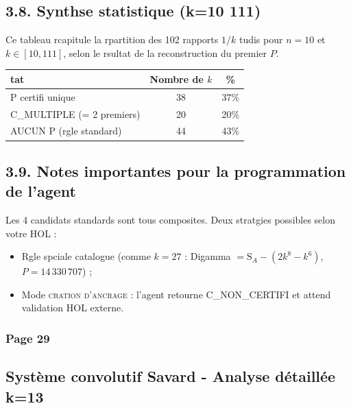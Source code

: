 \documentclass[11pt,a4paper]{article}
\newcommand{\SA}{\mathrm{S}_A}
\begin{document}
\subsection*{3.8. Synthse statistique (k=10  111)}

\vspace{0.3cm}

Ce tableau rcapitule la rpartition des 102 rapports $1/k$ tudis pour $n=10$ et $k \in [10,111]$, selon le rsultat de la reconstruction du premier $P$.

\begin{center}
\small
\begin{tabular}{@{}l c c@{}}
\toprule
\rowcolor{spectralgris}
\textbf{tat} & \textbf{Nombre de $k$} & \textbf{\%} \\
\midrule
P certifi unique & 38 & 37\% \\
C\_MULTIPLE (= 2 premiers) & 20 & 20\% \\
AUCUN P (rgle standard) & 44 & 43\% \\
\bottomrule
\end{tabular}
\end{center}

\vspace{0.3cm}

\subsection*{3.9. Notes importantes pour la programmation de l'agent}

\begin{boitealerte}
Les 4 candidats standards sont tous composites. Deux stratgies possibles selon votre HOL :
\begin{itemize}[nosep]
  \item Rgle spciale catalogue (comme $k=27$ : Digamma $= \SA - (2k^{8}-k^{6})$, $P = 14\,330\,707$) ;
  \item Mode \textsc{cration d'ancrage} : l'agent retourne C\_NON\_CERTIFI et attend validation HOL externe.
\end{itemize}
\end{boitealerte}

\vspace{0.3cm}

\subsubsection*{Page 29}
\subsection*{Système convolutif Savard - Analyse détaillée k=13}
\end{document}
